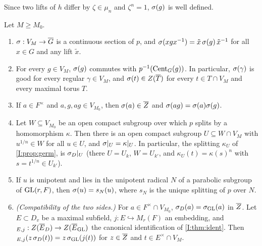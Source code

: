Since two lifts of $h$ differ by $\zeta\in\mu_n$ and $\zeta^n=1$, $\sigma(g)$ is well defined.

\begin{proposition}\label{II:prop:section}
Let $M\ge M_0$.
\begin{enumerate}[label=(\alph*)]
\item $\sigma:V_M\to\overline{G}$ is a continuous section of $p$, and $\sigma(xgx^{-1})=\tilde x\,\sigma(g)\,\tilde x^{-1}$ for all $x\in G$ and any lift $\tilde x$.
\item For every $g\in V_M$, $\sigma(g)$ commutes with $p^{-1}(\operatorname{Cent}_G(g))$. In particular, $\sigma(\gamma)$ is good for every regular $\gamma\in V_M$, and $\sigma(t)\in Z(\overline{T})$ for every $t\in T\cap V_M$ and every maximal torus $T$.
\item If $a\in F^\times$ and $a,g,ag\in V_{M_0}$, then $\sigma(a)\in\overline{Z}$ and $\sigma(ag)=\sigma(a)\sigma(g)$.
\item Let $W\subseteq V_{M_0}$ be an open compact subgroup over which $p$ splits by a homomorphism $\kappa$. Then there is an open compact subgroup $U\subseteq W\cap V_M$ with $u^{1/n}\in W$ for all $u\in U$, and $\sigma|_U=\kappa|_U$. In particular, the splitting $\kappa_U$ of \cref{I:prop:germ}, is $\sigma_D|_U$ (there $U=U_k$, $W=U_{k'}$, and $\kappa_U(t)=\kappa(s)^n$ with $s=t^{1/n}\in U_{k'}$).
\item If $u$ is unipotent and lies in the unipotent radical $N$ of a parabolic subgroup of $\mathrm{GL}(r,F)$, then $\sigma(u)=s_N(u)$, where $s_N$ is the unique splitting of $p$ over $N$.
\item \emph{(Compatibility of the two sides.)} For $a\in F^\times\cap V_{M_0}$, $\sigma_D(a)=\sigma_{\mathrm{GL}}(a)$ in $\overline{Z}$. Let $E\subset D_v$ be a maximal subfield, $j:E\hookrightarrow M_r(F)$ an embedding, and $\relax_{E,j}:Z(\overline{E}_D)\to Z(\overline{E}_{\mathrm{GL}})$ the canonical identification of \cref{I:thm:ident}. Then $\relax_{E,j}(z\,\sigma_D(t))=z\,\sigma_{\mathrm{GL}}(j(t))$ for $z\in\overline{Z}$ and $t\in E^\times\cap V_M$.
\end{enumerate}
\end{proposition}

